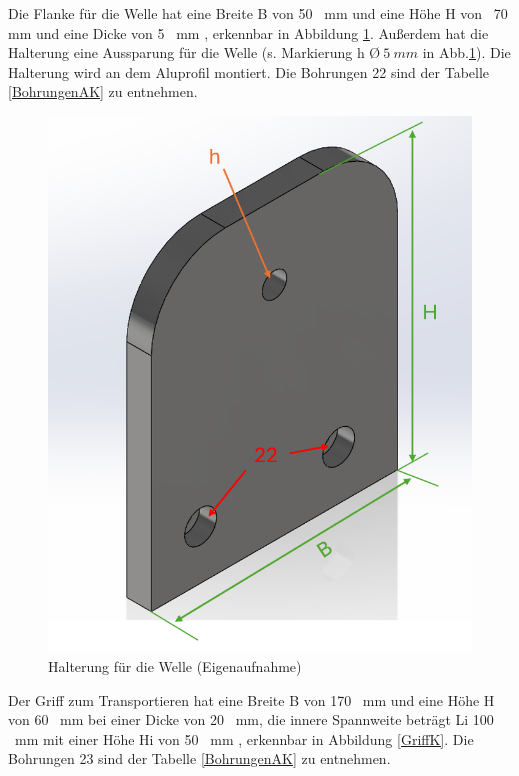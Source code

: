 Die Flanke für die Welle hat eine Breite B von 50 \ mm und eine Höhe H von \ 70 mm und eine Dicke von 5 \ mm , erkennbar in Abbildung \ref{FlankeK}. Außerdem hat die Halterung eine Aussparung für die Welle (s. Markierung h \O $ \ 5 \ mm$ in Abb.\ref{FlankeK}). Die Halterung wird an dem Aluprofil montiert. Die Bohrungen 22 sind der Tabelle \ref{BohrungenAK} zu entnehmen.  
 
\begin{figure}[H]
	\begin{center}
		\includegraphics[width=\textwidth]{Images/Konstruktion/FlankeK.png}
		\caption{Halterung für die Welle (Eigenaufnahme)} \label{FlankeK}
	\end{center}
\end{figure} 
 
Der Griff zum Transportieren hat eine Breite B von 170 \ mm und eine Höhe H von 60 \ mm bei einer Dicke von 20 \ mm, die innere Spannweite beträgt Li 100 \ mm mit einer Höhe Hi von  50 \ mm , erkennbar in Abbildung \ref{GriffK}. Die Bohrungen 23 sind der Tabelle \ref{BohrungenAK} zu entnehmen.  

